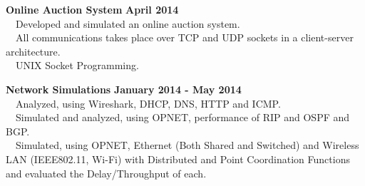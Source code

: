 \documentclass[margin,line]{resume}
\begin{document}
\begin{resume}
    \textbf{\listing Online Auction System} \hfill \textbf{April 2014}\vspace{2mm}\\
    \textbullet \ \ Developed and simulated an online auction system.\\
    \textbullet \ \ All communications takes place over TCP and UDP sockets in a client-server architecture.\\
    \textbullet \ \ UNIX Socket Programming.
    
    \textbf{\listing Network Simulations} \hfill \textbf{January 2014 - May 2014}\vspace{2mm}\\
    \textbullet \ \ Analyzed, using Wireshark, DHCP, DNS, HTTP and ICMP.\\
    \textbullet \ \ Simulated and analyzed, using OPNET, performance of RIP and OSPF and BGP.\\
    \textbullet \ \ Simulated, using OPNET, Ethernet (Both Shared and Switched) and Wireless LAN (IEEE802.11, Wi-Fi) with Distributed and Point Coordination Functions and evaluated the Delay/Throughput of each.
    

	
\end{resume}
\end{document}
